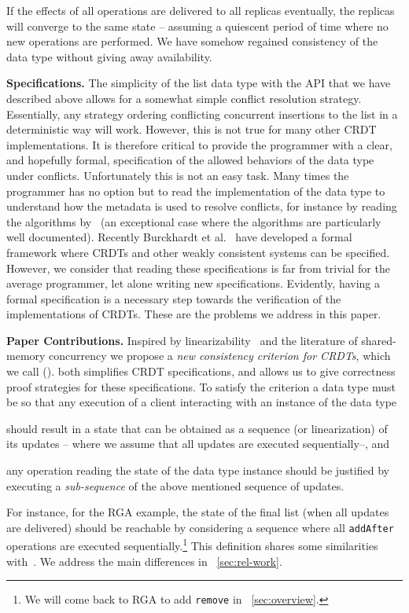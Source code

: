 If the effects of all operations are
delivered to all replicas eventually, the replicas will converge to
the same state -- assuming a quiescent period of time where no new
operations are performed.
%
We have somehow regained consistency of the data type without
giving away availability.

\smallskip
\noindent
{\bf Specifications.}
The simplicity of the list data type with the API that we have
described above allows for a somewhat simple conflict resolution
strategy.
%
Essentially, any strategy ordering conflicting concurrent insertions
to the list in a deterministic way will work.
%
However, this is not true for many other CRDT implementations.
%
It is therefore critical to provide the programmer with a clear, and
hopefully formal, specification of the allowed behaviors of the data
type under conflicts.
%
Unfortunately this is not an easy task.
%
Many times the programmer has no option but to read the implementation
of the data type to understand how the metadata is used to 
resolve conflicts, for instance by reading the algorithms
by~\citet{ShapiroPBZ11} (an exceptional case where the algorithms are
particularly well documented).
%
Recently Burckhardt et al.~\cite{BurckhardtGYZ14, Burckhardt14} have
developed a formal framework where CRDTs and other weakly
consistent systems can be specified.
%
However, we consider that reading these specifications is far from
trivial for the average programmer, let alone writing new
specifications.
%
Evidently, having a formal specification is a necessary step towards
the verification of the implementations of CRDTs.
%
These are the problems we address in this paper.

\noindent
{\bf Paper Contributions.}
Inspired by linearizability~\cite{HerlihyW90} and the literature of
shared-memory concurrency we propose a \emph{new consistency criterion
  for CRDTs}, which we call \emph{\CRDTLin{}} (\CRDTLinshort{}).
%
\CRDTLinshort{} both simplifies CRDT specifications, and allows us to
give correctness proof strategies for these specifications.
%
To satisfy the \CRDTLinshort{} criterion a data type must be so that
any execution of a client interacting with an instance of the data
type
\begin{inparaenum}
\item should result in a state that can be obtained as a sequence (or
  linearization) of its updates -- where we assume that all updates
  are executed sequentially--, and
\item any operation reading the state of the data type instance should
  be justified by executing a \emph{sub-sequence} of the above
  mentioned sequence of updates.
\end{inparaenum}
For instance, for the RGA example, the state of the final
list (when all updates are delivered) should be reachable by considering a sequence where all
\lstinline|addAfter|  operations are executed sequentially.\footnote{We
  will come back to RGA to add \lstinline|remove|
  in \sectionautorefname~\ref{sec:overview}.}
%
This definition shares some similarities with~\citet{PerrinMJ14}. 
%
We address the main differences in \sectionautorefname~\ref{sec:rel-work}.


